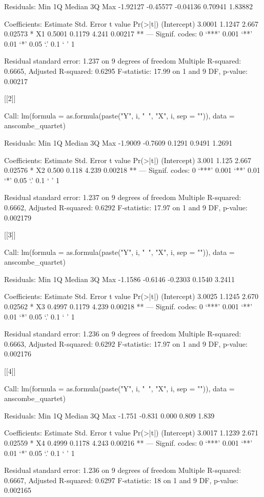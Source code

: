 \documentclass[a4paper]{article}
\begin{document}
\begin{itemize}
\begin{Schunk}
\begin{Soutput}
Residuals:
     Min       1Q   Median       3Q      Max 
-1.92127 -0.45577 -0.04136  0.70941  1.83882 

Coefficients:
            Estimate Std. Error t value Pr(>|t|)   
(Intercept)   3.0001     1.1247   2.667  0.02573 * 
X1            0.5001     0.1179   4.241  0.00217 **
---
Signif. codes:  0 ‘***’ 0.001 ‘**’ 0.01 ‘*’ 0.05 ‘.’ 0.1 ‘ ’ 1

Residual standard error: 1.237 on 9 degrees of freedom
Multiple R-squared:  0.6665,	Adjusted R-squared:  0.6295 
F-statistic: 17.99 on 1 and 9 DF,  p-value: 0.00217


[[2]]

Call:
lm(formula = as.formula(paste("Y", i, "~", "X", i, sep = "")), 
    data = anscombe_quartet)

Residuals:
    Min      1Q  Median      3Q     Max 
-1.9009 -0.7609  0.1291  0.9491  1.2691 

Coefficients:
            Estimate Std. Error t value Pr(>|t|)   
(Intercept)    3.001      1.125   2.667  0.02576 * 
X2             0.500      0.118   4.239  0.00218 **
---
Signif. codes:  0 ‘***’ 0.001 ‘**’ 0.01 ‘*’ 0.05 ‘.’ 0.1 ‘ ’ 1

Residual standard error: 1.237 on 9 degrees of freedom
Multiple R-squared:  0.6662,	Adjusted R-squared:  0.6292 
F-statistic: 17.97 on 1 and 9 DF,  p-value: 0.002179


[[3]]

Call:
lm(formula = as.formula(paste("Y", i, "~", "X", i, sep = "")), 
    data = anscombe_quartet)

Residuals:
    Min      1Q  Median      3Q     Max 
-1.1586 -0.6146 -0.2303  0.1540  3.2411 

Coefficients:
            Estimate Std. Error t value Pr(>|t|)   
(Intercept)   3.0025     1.1245   2.670  0.02562 * 
X3            0.4997     0.1179   4.239  0.00218 **
---
Signif. codes:  0 ‘***’ 0.001 ‘**’ 0.01 ‘*’ 0.05 ‘.’ 0.1 ‘ ’ 1

Residual standard error: 1.236 on 9 degrees of freedom
Multiple R-squared:  0.6663,	Adjusted R-squared:  0.6292 
F-statistic: 17.97 on 1 and 9 DF,  p-value: 0.002176


[[4]]

Call:
lm(formula = as.formula(paste("Y", i, "~", "X", i, sep = "")), 
    data = anscombe_quartet)

Residuals:
   Min     1Q Median     3Q    Max 
-1.751 -0.831  0.000  0.809  1.839 

Coefficients:
            Estimate Std. Error t value Pr(>|t|)   
(Intercept)   3.0017     1.1239   2.671  0.02559 * 
X4            0.4999     0.1178   4.243  0.00216 **
---
Signif. codes:  0 ‘***’ 0.001 ‘**’ 0.01 ‘*’ 0.05 ‘.’ 0.1 ‘ ’ 1

Residual standard error: 1.236 on 9 degrees of freedom
Multiple R-squared:  0.6667,	Adjusted R-squared:  0.6297 
F-statistic:    18 on 1 and 9 DF,  p-value: 0.002165
\end{Soutput}
\end{Schunk}
\end{itemize}
\end{document}
